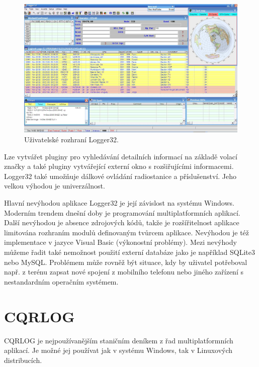 \begin{figure}[h]
\centering
\includegraphics[trim=0cm 0cm 0cm 0cm, scale=0.33]{fig/logger32}
\caption{Uživatelské rozhraní Logger32.}
\label{fig:logger32}
\end{figure}

Lze vytvářet pluginy pro vyhledávání detailních informací na základě volací značky a také pluginy vytvářející externí okno
s rozšiřujícími informacemi. Logger32 také umožňuje dálkové ovládání
radiostanice a příslušenství. Jeho velkou výhodou je univerzálnost.

Hlavní nevýhodou aplikace Logger32 je její závislost na systému Windows. Moderním trendem dnešní doby je programování multiplatformních
aplikací. Další nevýhodou je absence zdrojových kódů, takže je rozšířitelnost aplikace limitována rozhraním modulů definovaným
tvůrcem aplikace. Nevýhodou je též implementace v jazyce Visual Basic
(výkonostní problémy).
Mezi nevýhody můžeme řadit také nemožnost použití externí databáze jako je například SQLite3 nebo MySQL. Problémem může rovněž být
situace, kdy by uživatel potřeboval např. z terénu 
zapsat %
nové spojení z mobilního telefonu nebo jiného zařízení s nestandardním operačním systémem.

\section{CQRLOG}

CQRLOG je nejpoužívanějším staničním deníkem z řad multiplatformních aplikací. Je možné jej používat jak v systému
Windows, tak v Linuxových distribucích.

